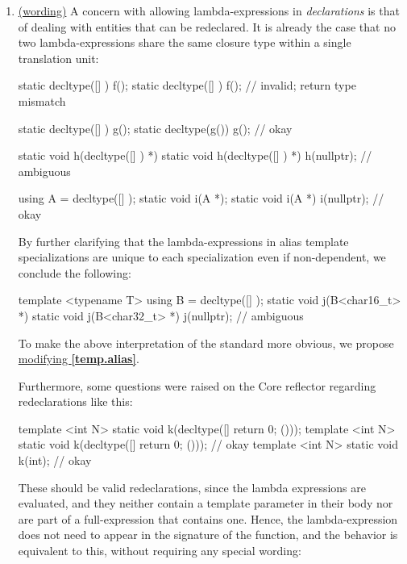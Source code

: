 \documentclass{wg21}
\begin{document}
\begin{enumerate}
  \item \label{discussion.redeclarations}
    \hyperref[wording.redeclarations]{(wording)}
    A concern with allowing lambda-expressions in \textit{declarations} is
    that of dealing with entities that can be redeclared. It is already the
    case that no two lambda-expressions share the same closure type within a
    single translation unit:

\begin{cpp}
static decltype([] { }) f();
static decltype([] { }) f(); // invalid; return type mismatch

static decltype([] { }) g();
static decltype(g()) g(); // okay

static void h(decltype([] { }) *) { }
static void h(decltype([] { }) *) { }
h(nullptr); // ambiguous

using A = decltype([] { });
static void i(A *);
static void i(A *) { }
i(nullptr); // okay
\end{cpp}

   By further clarifying that the lambda-expressions in alias template
   specializations are unique to each specialization even if non-dependent,
   we conclude the following:

\begin{cpp}
template <typename T>
using B = decltype([] { });
static void j(B<char16_t> *) { }
static void j(B<char32_t> *) { }
j(nullptr); // ambiguous
\end{cpp}

    To make the above interpretation of the standard more obvious, we propose
    \hyperref[wording.redeclarations]{modifying \textbf{[temp.alias]}}.

    Furthermore, some questions were raised on the Core reflector regarding
    redeclarations like this:
\begin{cpp}
template <int N> static void k(decltype([]{ return 0; }()));
template <int N> static void k(decltype([]{ return 0; }())); // okay
template <int N> static void k(int);                         // okay
\end{cpp}

    These should be valid redeclarations, since the lambda expressions are
    evaluated, and they neither contain a template parameter in their body
    nor are part of a full-expression that contains one. Hence, the lambda-expression
    does not need to appear in the signature of the function, and the behavior
    is equivalent to this, without requiring any special wording:


\end{enumerate}
\end{document}
